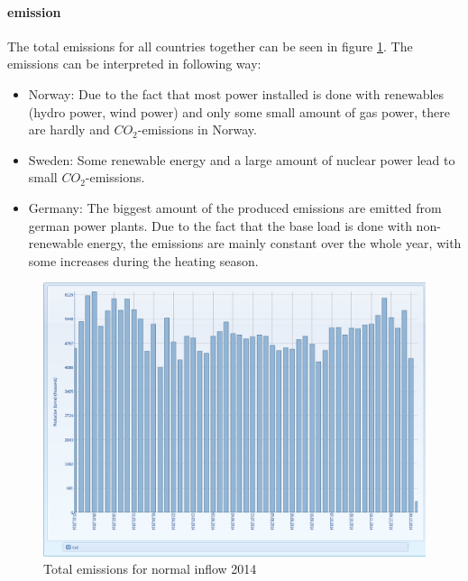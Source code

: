 \documentclass{article}
\begin{document}
\paragraph{emission\\}
The total emissions for all countries together can be seen in figure \ref{fig:MTemissionsnormal}. The emissions can be interpreted in following way:
\begin{itemize}
\item Norway: Due to the fact that most power installed is done with renewables (hydro power, wind power) and only some small amount of gas power, there are hardly and $CO_2$-emissions in Norway.
\item Sweden: Some renewable energy and a large amount of nuclear power lead to small $CO_2$-emissions. 
\item Germany: The biggest amount of the produced emissions are emitted from german power plants. Due to the fact that the base load is done with non-renewable energy, the emissions are mainly constant over the whole year, with some increases during the heating season.
\end{itemize}
\begin{figure}[htbp]
\begin{center}
\includegraphics[width=13cm,keepaspectratio=true]{figures/MTCO2}
\caption{Total emissions for normal inflow 2014}
\label{fig:MTemissionsnormal}
\end{center}
\end{figure}
\end{document}
